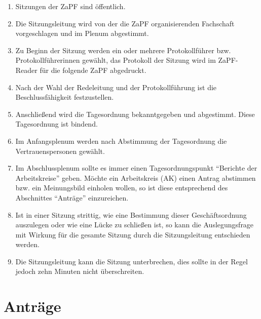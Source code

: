 \documentclass[draft,12pt,oneside]{scrreprt}
\begin{document}
\begin{enumerate}
  \item Sitzungen der ZaPF sind öffentlich.

  \item Die Sitzungsleitung wird von der die ZaPF organisierenden Fachschaft
        vorgeschlagen und im Plenum abgestimmt.

  \item Zu Beginn der Sitzung werden ein oder mehrere Protokollführer bzw.
        Protokollführerinnen gewählt, das Protokoll der Sitzung wird im
        ZaPF-Reader für die folgende ZaPF abgedruckt.

  \item Nach der Wahl der Redeleitung und der Protokollführung ist die
        Beschlussfähigkeit festzustellen.

  \item Anschließend wird die Tagesordnung bekanntgegeben und abgestimmt.
        Diese Tagesordnung ist bindend.

  \item Im Anfangsplenum werden nach Abstimmung der Tagesordnung die
        Vertrauenspersonen gewählt.

  \item Im Abschlussplenum sollte es immer einen Tagesordnungspunkt ``Berichte
        der Arbeitskreise'' geben.
        Möchte ein Arbeitskreis (AK) einen Antrag abstimmen bzw. ein Meinungsbild
        einholen wollen, so ist diese entsprechend des Abschnittes ``Anträge''
        einzureichen.

  \item Ist in einer Sitzung strittig, wie eine Bestimmung dieser Geschäftsordnung
        auszulegen oder wie eine Lücke zu schließen ist, so kann die Auslegungsfrage
        mit Wirkung für die gesamte Sitzung durch die Sitzungsleitung entschieden
        werden.

  \item Die Sitzungsleitung kann die Sitzung unterbrechen, dies sollte in der
        Regel jedoch zehn Minuten nicht überschreiten.
\end{enumerate}

\section{Anträge}
\end{document}

